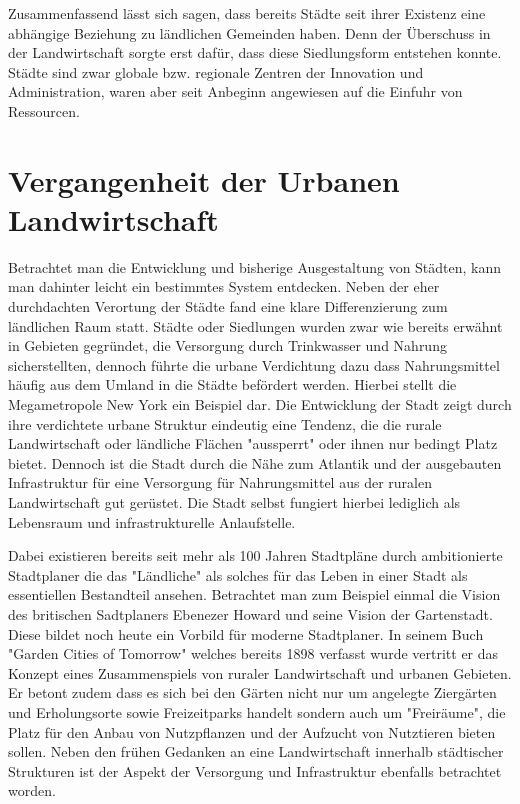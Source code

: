 \documentclass{scrartcl}
\begin{document}


Zusammenfassend lässt sich sagen, dass bereits Städte seit ihrer Existenz eine abhängige Beziehung zu ländlichen Gemeinden haben. Denn der Überschuss in der Landwirtschaft sorgte erst dafür, dass diese Siedlungsform entstehen konnte. Städte sind zwar globale bzw. regionale Zentren der Innovation und Administration, waren aber seit Anbeginn angewiesen auf die Einfuhr von Ressourcen. 


\section{Vergangenheit der Urbanen Landwirtschaft}

Betrachtet man die Entwicklung und bisherige Ausgestaltung von Städten, kann man dahinter leicht ein bestimmtes System entdecken. Neben der eher durchdachten Verortung der Städte fand eine klare Differenzierung zum ländlichen Raum statt. Städte oder Siedlungen wurden
zwar wie bereits erwähnt in Gebieten gegründet, die Versorgung durch Trinkwasser und Nahrung sicherstellten, dennoch führte die urbane Verdichtung dazu dass Nahrungsmittel häufig aus dem Umland in die Städte befördert werden. Hierbei stellt die Megametropole New York ein Beispiel dar. Die Entwicklung der Stadt zeigt durch ihre verdichtete urbane Struktur eindeutig eine Tendenz, die die rurale Landwirtschaft oder ländliche Flächen "aussperrt" oder ihnen nur bedingt Platz bietet. Dennoch ist die Stadt durch die Nähe zum Atlantik und der ausgebauten Infrastruktur für eine Versorgung für Nahrungsmittel aus der ruralen Landwirtschaft gut gerüstet. Die Stadt selbst fungiert hierbei lediglich als Lebensraum und infrastrukturelle Anlaufstelle.

Dabei existieren bereits seit mehr als 100 Jahren Stadtpläne durch ambitionierte Stadtplaner die das "Ländliche" als solches für das Leben in einer
Stadt als essentiellen Bestandteil ansehen. Betrachtet man zum Beispiel einmal die Vision des britischen Sadtplaners Ebenezer Howard und seine Vision der Gartenstadt. Diese bildet noch heute ein Vorbild für moderne Stadtplaner. In seinem Buch "Garden Cities of Tomorrow" welches bereits 1898 verfasst wurde vertritt er das Konzept eines Zusammenspiels von ruraler Landwirtschaft und urbanen Gebieten. Er betont zudem dass es sich bei den
Gärten nicht nur um angelegte Ziergärten und Erholungsorte sowie Freizeitparks handelt sondern auch um "Freiräume", die Platz für den Anbau von
Nutzpflanzen und der Aufzucht von Nutztieren bieten sollen. Neben den frühen Gedanken an eine Landwirtschaft innerhalb städtischer Strukturen ist der Aspekt der Versorgung und Infrastruktur ebenfalls betrachtet worden.
\end{document}
